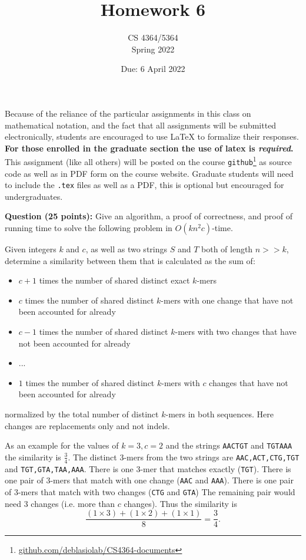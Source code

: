 \documentclass[11pt, oneside]{article}   	%
\title{Homework 6}
\author{CS 4364/5364\\Spring 2022}
\date{Due: 6 April 2022}							%
\begin{document}
\maketitle

Because of the reliance of the particular assignments in this class on mathematical notation, 
and the fact that all assignments will be submitted electronically, 
students are encouraged to use \LaTeX{} to formalize their responses. 
\textbf{For those enrolled in the graduate section the use of latex is \emph{required}.}
This assignment (like all others) will be posted on the course \texttt{github}\footnote{\url{github.com/deblasiolab/CS4364-documents}} as source code as well as in PDF form on the course website. 
Graduate students will need to include the \texttt{.tex} files as well as a PDF, this is optional but encouraged for undergraduates. 

\textbf{Question (25 points):} 
Give an algorithm, a proof of correctness, and proof of running time to solve the following problem in $O(kn^2c)$-time.

Given integers $k$ and $c$, as well as two strings $S$ and $T$ both of length $n >> k$, determine a similarity between them that is calculated as the sum of: 
\begin{itemize}
\item $c+1$ times the number of shared distinct exact $k$-mers
\item $c$ times the number of shared distinct $k$-mers with one change that have not been accounted for already
\item $c-1$ times the number of shared distinct $k$-mers with two changes that have not been accounted for already
\item ...
\item $1$ times the number of shared distinct $k$-mers with $c$ changes that have not been accounted for already
\end{itemize}
normalized by the total number of distinct $k$-mers in both sequences.
Here changes are replacements only and not indels. 

As an example for the values of $k=3, c=2$ and the strings \texttt{AACTGT} and \texttt{TGTAAA} the similarity is $\frac{3}{4}$. 
The distinct $3$-mers from the two strings are \texttt{AAC,ACT,CTG,TGT} and \texttt{TGT,GTA,TAA,AAA}.
There is one $3$-mer that matches exactly (\texttt{TGT}).
There is one pair of $3$-mers that match with one change (\texttt{AAC} and \texttt{AAA}).
There is one pair of $3$-mers that match with two changes (\texttt{CTG} and \texttt{GTA})
The remaining pair would need 3 changes (i.e. more than $c$ changes). 
Thus the similarity is 
\[
\frac{(1\times 3) + (1 \times 2) + (1 \times 1)}{8} = \frac{3}{4}.
\]
\end{document}
